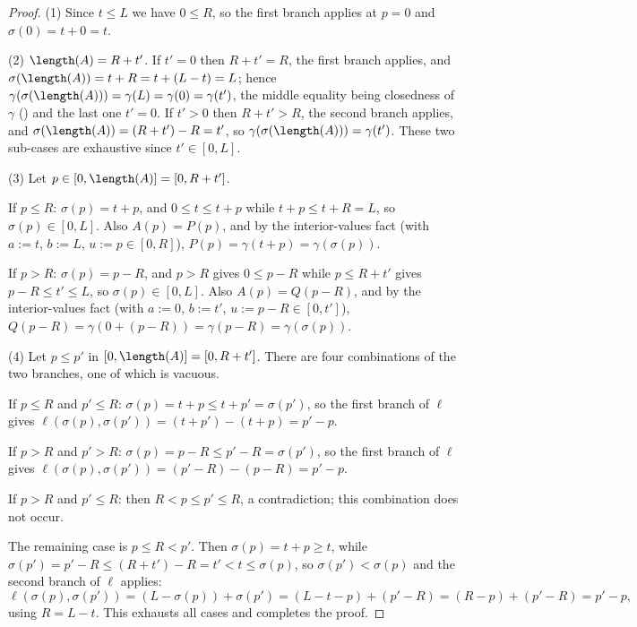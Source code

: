 \begin{proof}
  (1) Since $t \le L$ we have $0 \le R$, so the first branch applies at $p=0$ and
  $\sigma(0) = t+0 = t$.

  (2) $\length(A) = R+t'$. If $t' = 0$ then $R + t' = R$, the first branch applies, and
  $\sigma(\length(A)) = t + R = t + (L-t) = L$; hence $\gamma(\sigma(\length(A))) = \gamma(L) =
  \gamma(0) = \gamma(t')$, the middle equality being closedness of $\gamma$
  () and the last one $t' = 0$. If $t' > 0$ then $R + t' > R$, the second
  branch applies, and $\sigma(\length(A)) = (R+t') - R = t'$, so
  $\gamma(\sigma(\length(A))) = \gamma(t')$. These two sub-cases are exhaustive since
  $t' \in [0,L]$.

  (3) Let $p \in [0,\length(A)] = [0,R+t']$.

  If $p \le R$: $\sigma(p) = t+p$, and $0 \le t \le t+p$ while $t+p \le t+R = L$, so
  $\sigma(p) \in [0,L]$. Also $A(p) = P(p)$, and by the interior-values fact (with $a := t$,
  $b := L$, $u := p \in [0,R]$), $P(p) = \gamma(t+p) = \gamma(\sigma(p))$.

  If $p > R$: $\sigma(p) = p-R$, and $p > R$ gives $0 \le p-R$ while $p \le R+t'$ gives
  $p - R \le t' \le L$, so $\sigma(p) \in [0,L]$. Also $A(p) = Q(p-R)$, and by the
  interior-values fact (with $a := 0$, $b := t'$, $u := p-R \in [0,t']$),
  $Q(p-R) = \gamma(0 + (p-R)) = \gamma(p-R) = \gamma(\sigma(p))$.

  (4) Let $p \le p'$ in $[0,\length(A)] = [0,R+t']$. There are four combinations of the two
  branches, one of which is vacuous.

  If $p \le R$ and $p' \le R$: $\sigma(p) = t+p \le t+p' = \sigma(p')$, so the first branch of
  $\ell$ gives $\ell(\sigma(p),\sigma(p')) = (t+p')-(t+p) = p'-p$.

  If $p > R$ and $p' > R$: $\sigma(p) = p-R \le p'-R = \sigma(p')$, so the first branch of $\ell$
  gives $\ell(\sigma(p),\sigma(p')) = (p'-R)-(p-R) = p'-p$.

  If $p > R$ and $p' \le R$: then $R < p \le p' \le R$, a contradiction; this combination does not
  occur.

  The remaining case is $p \le R < p'$. Then $\sigma(p) = t+p \ge t$, while
  $\sigma(p') = p'-R \le (R+t')-R = t' < t \le \sigma(p)$, so $\sigma(p') < \sigma(p)$ and the
  second branch of $\ell$ applies:
  \[
    \ell(\sigma(p),\sigma(p')) = (L - \sigma(p)) + \sigma(p') = (L - t - p) + (p'-R)
    = (R - p) + (p' - R) = p'-p
    ,
  \]
  using $R = L-t$. This exhausts all cases and completes the proof.
\end{proof}
